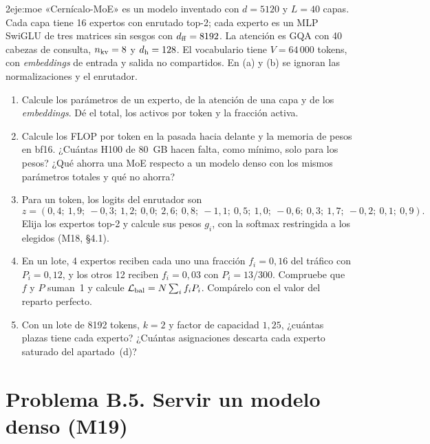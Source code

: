 \begin{ejercicio}{2}{eje:moe}
«Cernícalo-MoE» es un modelo inventado con $d=5120$ y $L=40$ capas. Cada capa tiene 16 expertos con enrutado top-2; cada experto es un MLP SwiGLU de tres matrices sin sesgos con $d_{\mathrm{ff}}=8192$. La atención es GQA con 40 cabezas de consulta, $n_{\mathrm{kv}}=8$ y $d_{\mathrm{h}}=128$. El vocabulario tiene $V=64\,000$ tokens, con \emph{embeddings} de entrada y salida no compartidos. En (a) y (b) se ignoran las normalizaciones y el enrutador.
\begin{enumerate}[label=(\alph*)]
  \item {} Calcule los parámetros de un experto, de la atención de una capa y de los \emph{embeddings}. Dé el total, los activos por token y la fracción activa.
  \item {} Calcule los FLOP por token en la pasada hacia delante y la memoria de pesos en bf16. ¿Cuántas H100 de 80~GB hacen falta, como mínimo, solo para los pesos? ¿Qué ahorra una MoE respecto a un modelo denso con los mismos parámetros totales y qué no ahorra?
  \item {} Para un token, los logits del enrutador son
  \[
  z=(0{,}4;\ 1{,}9;\ -0{,}3;\ 1{,}2;\ 0{,}0;\ 2{,}6;\ 0{,}8;\ -1{,}1;\ 0{,}5;\ 1{,}0;\ -0{,}6;\ 0{,}3;\ 1{,}7;\ -0{,}2;\ 0{,}1;\ 0{,}9).
  \]
  Elija los expertos top-2 y calcule sus pesos $g_i$, con la softmax restringida a los elegidos (M18, §4.1).
  \item {} En un lote, 4 expertos reciben cada uno una fracción $f_i=0{,}16$ del tráfico con $P_i=0{,}12$, y los otros 12 reciben $f_i=0{,}03$ con $P_i=13/300$. Compruebe que $f$ y $P$ suman~1 y calcule $\mathcal{L}_{\mathrm{bal}}=N\sum_i f_iP_i$. Compárelo con el valor del reparto perfecto.
  \item {} Con un lote de 8192 tokens, $k=2$ y factor de capacidad $1{,}25$, ¿cuántas plazas tiene cada experto? ¿Cuántas asignaciones descarta cada experto saturado del apartado~(d)?
\end{enumerate}
\end{ejercicio}

\section*{Problema B.5. Servir un modelo denso (M19)}


